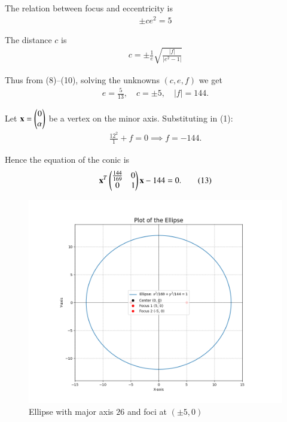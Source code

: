\documentclass[journal]{IEEEtran}
\begin{document}
The relation between focus and eccentricity is
\begin{align}
\pm ce^2 = 5 \tag{9}
\end{align}

The distance $c$ is
\begin{align}
c = \pm \frac{1}{e}\sqrt{\frac{|f|}{|e^2-1|}} \tag{10}
\end{align}

Thus from (8)--(10), solving the unknowns $(c,e,f)$ we get
\begin{align}
e = \tfrac{5}{13},\quad c = \pm 5, \quad |f| = 144. \tag{11}
\end{align}

Let $\mathbf{x}=\begin{pmatrix}0\\\alpha\end{pmatrix}$ be a vertex on the minor axis. Substituting in (1):
\begin{align}
\frac{12^2}{1} + f = 0 \implies f=-144. \tag{12}
\end{align}

Hence the equation of the conic is
\begin{align*}
\mathbf{x}^T \begin{pmatrix}\tfrac{144}{169} & 0 \\ 0 & 1\end{pmatrix} \mathbf{x} - 144 = 0. \tag{13}
\end{align*}

\begin{figure}[H]
    \centering
    \includegraphics[width=0.9\linewidth]{figs/fig3.png}
    \caption{Ellipse with major axis $26$ and foci at $(\pm 5,0)$}
    \label{fig:ellipse}
\end{figure}
\end{document}
